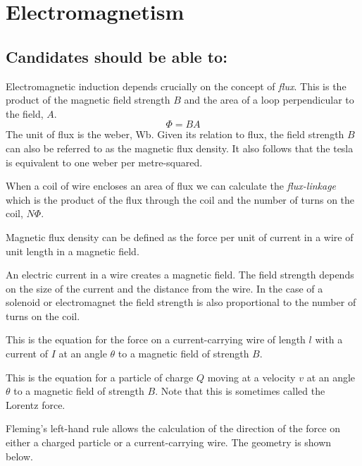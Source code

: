\documentclass[revision-guide.tex]{subfiles}
\begin{document}
\chapter{Electromagnetism}

\section*{Candidates should be able to:}

Electromagnetic induction depends crucially on the concept of \emph{flux}. This is the product of the magnetic field strength $B$ and the area of a loop perpendicular to the field, $A$.
\[ \Phi = BA \]
The unit of flux is the weber, Wb. Given its relation to flux, the field strength $B$ can also be referred to as the magnetic flux density. It also follows that the tesla is equivalent to one weber per metre-squared.

When a coil of wire encloses an area of flux we can calculate the \emph{flux-linkage} which is the product of the flux through the coil and the number of turns on the coil, $N\Phi$.

Magnetic flux density can be defined as the force per unit of current in a wire of unit length in a magnetic field.


An electric current in a wire creates a magnetic field. The field strength depends on the size of the current and the distance from the wire. In the case of a solenoid or electromagnet the field strength is also proportional to the number of turns on the coil.


This is the equation for the force on a current-carrying wire of length $l$ with a current of $I$ at an angle $\theta$ to a magnetic field of strength $B$.


This is the equation for a particle of charge $Q$ moving at a velocity $v$ at an angle $\theta$ to a magnetic field of strength $B$. Note that this is sometimes called the Lorentz force.


Fleming's left-hand rule allows the calculation of the direction of the force on either a charged particle or a current-carrying wire. The geometry is shown below.
\end{document}
